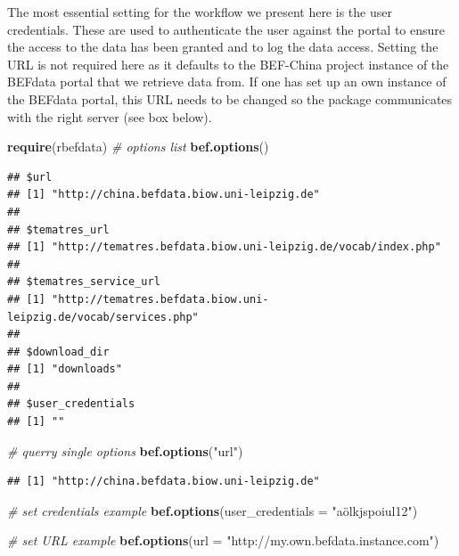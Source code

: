 \documentclass[]{article}
\newenvironment{Shaded}{}{}
\newcommand{\KeywordTok}[1]{\textcolor[rgb]{0.00,0.44,0.13}{\textbf{{#1}}}}
\newcommand{\DataTypeTok}[1]{\textcolor[rgb]{0.56,0.13,0.00}{{#1}}}
\newcommand{\StringTok}[1]{\textcolor[rgb]{0.25,0.44,0.63}{{#1}}}
\newcommand{\CommentTok}[1]{\textcolor[rgb]{0.38,0.63,0.69}{\textit{{#1}}}}
\newcommand{\NormalTok}[1]{{#1}}
\begin{document}
The most essential setting for the workflow we present here is the user
credentials. These are used to authenticate the user against the portal
to ensure the access to the data has been granted and to log the data
access. Setting the URL is not required here as it defaults to the
BEF-China project instance of the BEFdata portal that we retrieve data
from. If one has set up an own instance of the BEFdata portal, this URL
needs to be changed so the package communicates with the right server
(see box below).

\begin{Shaded}
\begin{Highlighting}[]
\KeywordTok{require}\NormalTok{(rbefdata)}
\CommentTok{# options list}
\KeywordTok{bef.options}\NormalTok{()}
\end{Highlighting}
\end{Shaded}

\begin{verbatim}
## $url
## [1] "http://china.befdata.biow.uni-leipzig.de"
## 
## $tematres_url
## [1] "http://tematres.befdata.biow.uni-leipzig.de/vocab/index.php"
## 
## $tematres_service_url
## [1] "http://tematres.befdata.biow.uni-leipzig.de/vocab/services.php"
## 
## $download_dir
## [1] "downloads"
## 
## $user_credentials
## [1] ""
\end{verbatim}

\begin{Shaded}
\begin{Highlighting}[]

\CommentTok{# querry single options}
\KeywordTok{bef.options}\NormalTok{(}\StringTok{"url"}\NormalTok{)}
\end{Highlighting}
\end{Shaded}

\begin{verbatim}
## [1] "http://china.befdata.biow.uni-leipzig.de"
\end{verbatim}

\begin{Shaded}
\begin{Highlighting}[]
\CommentTok{# set credentials example}
\KeywordTok{bef.options}\NormalTok{(}\DataTypeTok{user_credentials =} \StringTok{"aölkjspoiul12"}\NormalTok{)}
\end{Highlighting}
\end{Shaded}

\begin{Shaded}
\begin{Highlighting}[]
\CommentTok{# set URL example}
\KeywordTok{bef.options}\NormalTok{(}\DataTypeTok{url =} \StringTok{"http://my.own.befdata.instance.com"}\NormalTok{)}
\end{Highlighting}
\end{Shaded}
\end{document}
